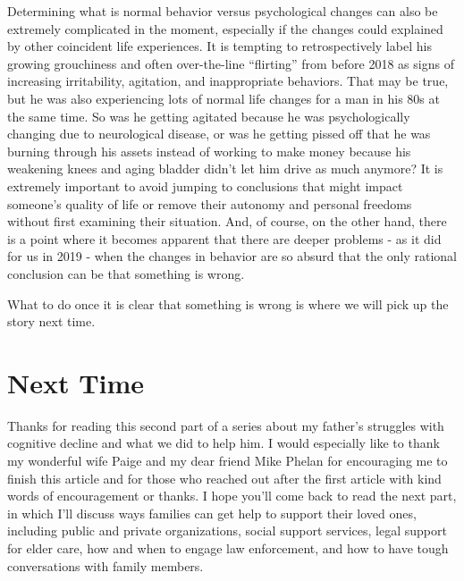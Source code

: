 \documentclass{article}
\begin{document}
Determining what is normal behavior versus psychological changes can also be extremely complicated in the moment, especially if the changes could explained by other coincident life experiences. It is tempting to retrospectively label his growing grouchiness and often over-the-line ``flirting'' from before 2018 as signs of increasing irritability, agitation, and inappropriate behaviors. That may be true, but he was also experiencing lots of normal life changes for a man in his 80s at the same time. So was he getting agitated because he was psychologically changing due to neurological disease, or was he getting pissed off that he was burning through his assets instead of working to make money because his weakening knees and aging bladder didn't let him drive as much anymore? It is extremely important to avoid jumping to conclusions that might impact someone's quality of life or remove their autonomy and personal freedoms without first examining their situation. And, of course, on the other hand, there is a point where it becomes apparent that there are deeper problems - as it did for us in 2019 - when the changes in behavior are so absurd that the only rational conclusion can be that something is wrong.

What to do once it is clear that something is wrong is where we will pick up the story next time.

\section*{Next Time}

Thanks for reading this second part of a series about my father’s struggles with cognitive decline and what we did to help him. I would especially like to thank my wonderful wife Paige and my dear friend Mike Phelan for encouraging me to finish this article and for those who reached out after the first article with kind words of encouragement or thanks. I hope you’ll come back to read the next part, in which I'll discuss ways families can get help to support their loved ones, including public and private organizations, social support services, legal support for elder care, how and when to engage law enforcement, and how to have tough conversations with family members.

\end{document}
